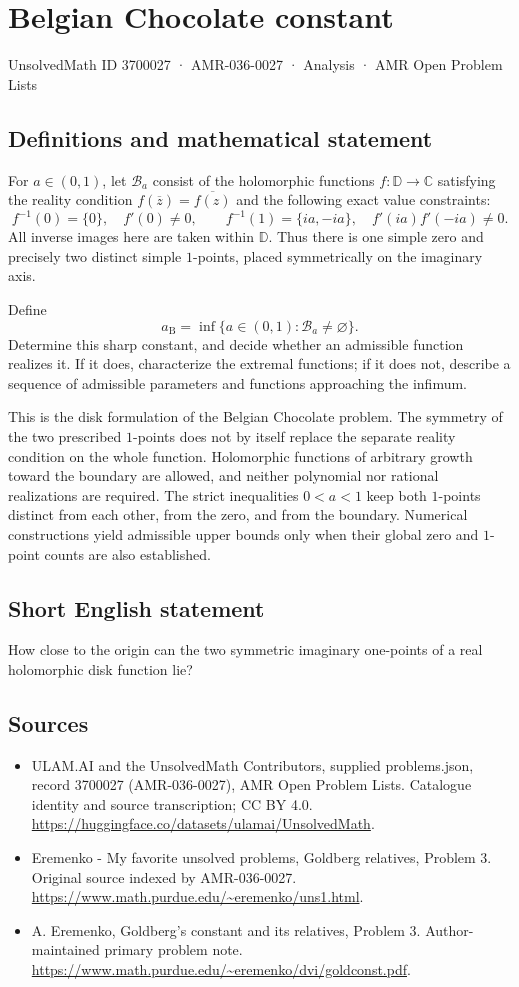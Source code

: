 \documentclass[11pt,a4paper]{article}
\begin{document}
\section*{Belgian Chocolate constant}\label{3700027}
{\small UnsolvedMath ID 3700027 · AMR-036-0027 · Analysis · AMR Open Problem Lists}
\subsection{Definitions and mathematical statement}
For $a\in(0,1)$, let $\mathcal B_a$ consist of the
holomorphic functions $f:\mathbb D\to\mathbb C$ satisfying
the reality condition
$f(\overline z)=\overline{f(z)}$ and the following exact
value constraints:
\[
 f^{-1}(0)=\{0\},\quad f'(0)\ne0,\qquad
 f^{-1}(1)=\{ia,-ia\},\quad
 f'(ia)f'(-ia)\ne0.
\]
All inverse images here are taken within $\mathbb D$.
Thus there is one simple zero and precisely two
distinct simple $1$-points, placed symmetrically on
the imaginary axis.

Define
\[
                 a_{\mathrm B}=
                    \inf\{a\in(0,1):\mathcal B_a\ne\varnothing\}.
\]
Determine this sharp constant, and decide whether an
admissible function realizes it. If it does, characterize
the extremal functions; if it does not, describe a
sequence of admissible parameters and functions approaching
the infimum.

This is the disk formulation of the Belgian Chocolate
problem. The symmetry of the two prescribed $1$-points
does not by itself replace the separate reality condition
on the whole function. Holomorphic functions of arbitrary
growth toward the boundary are allowed, and neither
polynomial nor rational realizations are required.
The strict inequalities $0<a<1$ keep both $1$-points
distinct from each other, from the zero, and from the
boundary. Numerical constructions yield admissible upper
bounds only when their global zero and $1$-point
counts are also established.
\subsection{Short English statement}
How close to the origin can the two symmetric imaginary one-points of a real holomorphic disk function lie?
\subsection{Sources}
\begin{itemize}
\item[S1] ULAM.AI and the UnsolvedMath Contributors, supplied problems.json, record 3700027 (AMR-036-0027), AMR Open Problem Lists. Catalogue identity and source transcription; CC BY 4.0.
\url{https://huggingface.co/datasets/ulamai/UnsolvedMath}.
\item[S2] Eremenko - My favorite unsolved problems, Goldberg relatives, Problem 3. Original source indexed by AMR-036-0027.
\url{https://www.math.purdue.edu/~eremenko/uns1.html}.
\item[S3] A. Eremenko, Goldberg's constant and its relatives, Problem 3. Author-maintained primary problem note.
\url{https://www.math.purdue.edu/~eremenko/dvi/goldconst.pdf}.
\end{itemize}
\end{document}
